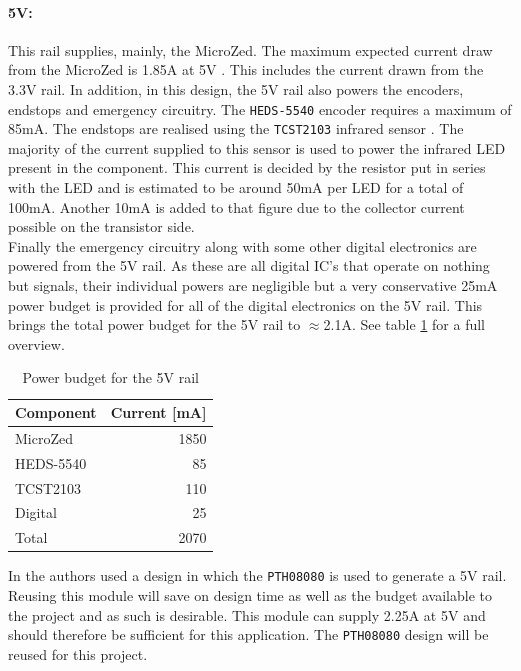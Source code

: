 \paragraph{5V:} %
\label{par:5v}
This rail supplies, mainly, the MicroZed.
The maximum expected current draw from the MicroZed is 1.85A at 5V \cite{microzed}.
This includes the current drawn from the 3.3V rail.
In addition, in this design, the 5V rail also powers the encoders, endstops and emergency circuitry.
The \texttt{HEDS-5540} \cite{heds5540} encoder requires a maximum of 85mA.
The endstops are realised using the \texttt{TCST2103} infrared sensor \cite{tcst2103}.
The majority of the current supplied to this sensor is used to power the infrared LED present in the component.
This current is decided by the resistor put in series with the LED and is estimated to be around 50mA per LED for a total of 100mA.
Another 10mA is added to that figure due to the collector current possible on the transistor side.\\
Finally the emergency circuitry along with some other digital electronics are powered from the 5V rail.
As these are all digital IC's that operate on nothing but signals, their individual powers are negligible but a very conservative 25mA power budget is provided for all of the digital electronics on the 5V rail. This brings the total power budget for the 5V rail to $\approx$2.1A.
See table \ref{tab:5vpowerbudget} for a full overview.

\begin{table}
	\centering
	\begin{tabular}{l|r}
		 Component & Current [mA]\\
		 \hline
		 MicroZed & 1850\\
		 HEDS-5540 & 85\\
		 TCST2103 & 110\\
		 Digital & 25\\
		 \hline
		 Total & 2070
	\end{tabular}
	\caption{Power budget for the 5V rail}
	\label{tab:5vpowerbudget}
\end{table}

In \cite{isaswarm} the authors used a design in which the \texttt{PTH08080} is used to generate a 5V rail.
Reusing this module will save on design time as well as the budget available to the project and as such is desirable.
This module can supply 2.25A at 5V and should therefore be sufficient for this application.
The \texttt{PTH08080} design will be reused for this project.

